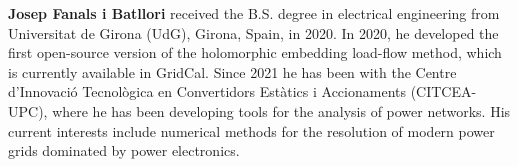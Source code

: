 \textbf{Josep Fanals i Batllori} received the B.S. degree in electrical engineering from Universitat de Girona (UdG), Girona, Spain, in 2020. In 2020, he developed the first open-source version of the holomorphic embedding load-flow method, which is currently available in GridCal. Since 2021 he has been with the Centre d'Innovació Tecnològica en Convertidors Estàtics i Accionaments (CITCEA-UPC), where he has been developing tools for the analysis of power networks. His current interests include numerical methods for the resolution of modern power grids dominated by power electronics. 
